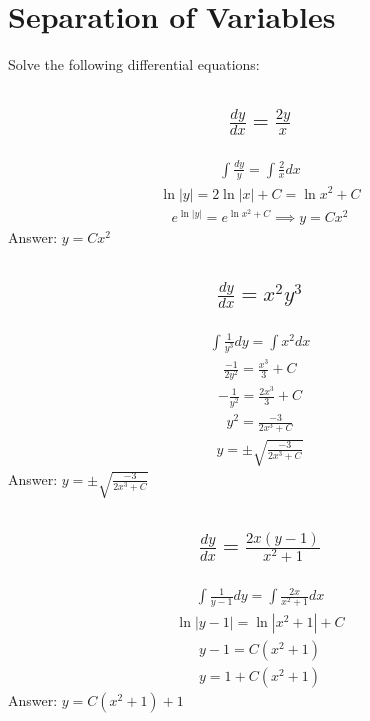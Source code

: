 \documentclass{article}
\begin{document}
\section{Separation of Variables}
Solve the following differential equations:
\subsection{
	\begin{align*}
		\frac{dy}{dx} = \frac{2y}{x}
	\end{align*}
}
\begin{align*}
	\int {\frac{dy}{y}} = \int{ \frac{2}{x} dx}
\end{align*}
\begin{align*}
	\ln{|y|} = 2\ln{|x|} + C = \ln{x^2} + C
\end{align*}
\begin{align*}
	e^{\ln{|y|}} = e^{\ln{x^2} + C} \implies y = Cx^2
\end{align*}
Answer: $y = Cx^2$

\subsection{
	\begin{align*}
		\frac{dy}{dx} = x^2 y^3
	\end{align*}
}
\begin{align*}
	\int{\frac{1}{y^3}dy} = \int{x^2 dx}
\end{align*}
\begin{align*}
	\frac{-1}{2y^2} = \frac{x^3}{3} + C
\end{align*}
\begin{align*}
	-\frac{1}{y^2} = \frac{2x^3}{3} + C
\end{align*}
\begin{align*}
	y^2 = \frac{-3}{2x^3 + C}
\end{align*}
\begin{align*}
	y = \pm \sqrt{\frac{-3}{2x^3 + C}}
\end{align*}
Answer: $y = \pm \sqrt{\frac{-3}{2x^3 + C}}$

\subsection{
	\begin{align*}
		\frac{dy}{dx} = \frac{2x(y - 1)}{x^2 + 1}
	\end{align*}
}
\begin{align*}
	\int{\frac{1}{y - 1} dy} = \int{\frac{2x}{x^2 + 1}dx}
\end{align*}
\begin{align*}
	\ln{|y - 1|} = \ln{|x^2 + 1|} + C
\end{align*}
\begin{align*}
	y - 1 = C(x^2 + 1)
\end{align*}
\begin{align*}
	y = 1 + C(x^2 + 1)
\end{align*}
Answer: $y = C(x^2 + 1) + 1$
\end{document}

